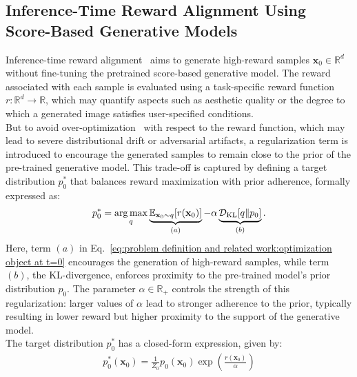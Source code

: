 \subsection{Inference-Time Reward Alignment Using Score-Based Generative Models}
\label{sec:problem definition and related work:inference-time reward alignment}
Inference-time reward alignment~\cite{uehara2025inference, kim2025DAS, kim2025inference, wu2023tds, dou2024fps, singh2025code, li2024svdd} aims to generate high-reward samples $\mathbf{x}_0\in \mathbb{R}^{d}$ without fine-tuning the pretrained score-based generative model. 
The reward associated with each sample is evaluated using a task-specific reward function $r:\mathbb{R}^d \rightarrow \mathbb{R}$, which may quantify aspects such as aesthetic quality or the degree to which a generated image satisfies user-specified conditions.\\
But to avoid over-optimization~\cite{fan2023reinforcement,uehara2024finetuningcontinuoustimediffusionmodels, kim2025DAS} with respect to the reward function, which may lead to severe distributional drift or adversarial artifacts, a regularization term is introduced to encourage the generated samples to remain close to the prior of the pre-trained generative model. This trade-off is captured by defining a target distribution $p_0^*$ that balances reward maximization with prior adherence, formally expressed as:
\begin{align}
    \label{eq:problem definition and related work:optimization object at t=0}
    p_0^* = \operatorname*{arg\,max}_{q} \underbrace{\mathbb{E}_{\mathbf{x}_0\sim q}[r(\mathbf{x}_0)]}_{(a)}-\alpha \underbrace{\mathcal{D}_{\text{KL}}[q\|p_0]}_{(b)}.
\end{align}
Here, term $(a)$ in Eq.~\ref{eq:problem definition and related work:optimization object at t=0} encourages the generation of high-reward samples, while term $(b)$, the KL-divergence, enforces proximity to the pre-trained model’s prior distribution $p_0$. The parameter $\alpha\in \mathbb{R}_{+}$ controls the strength of this regularization: larger values of $\alpha$ lead to stronger adherence to the prior, typically resulting in lower reward but higher proximity to the support of the generative model.\\
The target distribution $p_0^*$ has a closed-form expression, given by:
\begin{align}
    \label{eq:problem definition and related work:target distribution at t=0}
    p_0^*(\mathbf{x}_0)=\frac{1}{Z_0}p_0(\mathbf{x}_0)\exp\left( \frac{r(\mathbf{x}_0)}{\alpha} \right)
\end{align}
